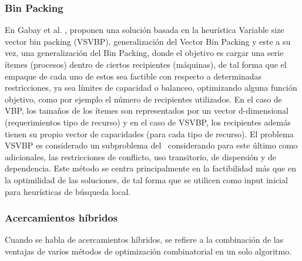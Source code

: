 \documentclass[../informe2.tex]{subfiles}
\begin{document}
\subsubsection{Bin Packing}
En Gabay et al. \cite{gabay2013variable}, proponen una solución basada en la heurística Variable size vector bin packing (VSVBP), generalización del Vector Bin Packing y este a su vez, una generalización del Bin Packing, donde el objetivo es cargar una serie ítemes (procesos) dentro de ciertos recipientes (máquinas), de tal forma que el empaque de cada uno de estos sea factible con respecto a determinadas restricciones, ya sea límites de capacidad o balanceo, optimizando alguna función objetivo, como por ejemplo el número de recipientes utilizados. En el caso de VBP, los tamaños de los ítemes son representados por un vector d-dimensional (requerimientos tipo de recurso) y en el caso de VSVBP, los recipientes además tienen su propio vector de capacidades (para cada tipo de recurso). El problema VSVBP es considerado un subproblema del \mrp\, considerando para este último como adicionales, las restricciones de conflicto, uso transitorio, de dispersión y de dependencia. Este método se centra principalmente en la factibilidad más que en la optimilidad de las soluciones, de tal forma que se utilicen como input inicial para heurísticas de búsqueda local. \\


\subsubsection{Acercamientos híbridos}
Cuando se habla de acercamientos híbridos, se refiere a la combinación de las ventajas de varios métodos de optimización combinatorial en un solo algoritmo.\\
\end{document}
